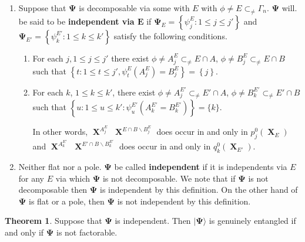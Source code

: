 \documentclass[a4paper,12pt]{article}
\DeclareMathOperator{\x}{\mathrm{X}}
\theoremstyle{definition}
\theoremstyle{underlinethm}
\newtheorem{thm}{Theorem}[section]
\theoremstyle{definition}
\begin{document}
\begin{enumerate}[label = (\roman*)]
 \item Suppose that $\boldsymbol{\Psi}$ is decomposable via some with $E$ with $\phi  \neq E \subset_{\neq} \Gamma_{n}$. $\boldsymbol{\Psi}$ will. be said to be \textbf{independent via $\boldsymbol{E}$} if $ \boldsymbol{\Psi}_{E} = \left\{\psi_{j}^{E} : 1 \leq j \leq j' \right\}$ and $\boldsymbol{\Psi}_{E'} = \left\{\psi_{k}^{E'} : 1 \leq k \leq k' \right\}$  satisfy the following conditions.
\begin{enumerate}[label = (\alph*)]
\item For each $j, 1 \leq j \leq j'$ there exist $\phi \neq A^{E}_{j} \subset_{\neq} E \cap A$, $\phi \neq B_{j}^{E} \subset_{\neq} E \cap B$ such that $\left\{t : 1 \leq t \leq j', \psi_{t}^{E} (A_{j}^{E}) = B_{j}^{E}\right\} = \left\{j\right\}$.

\item For each $k$, $1 \leq k \leq k'$, there exist $\phi \neq A_{j}^{E'} \subset_{\neq} E' \cap A$, $\phi\neq B_{k}^{E'} \subset_{\neq} E' \cap B $ such that $\left\{ u : 1 \leq u \leq k' : \psi_{u}^{E'} (A_{k}^{E'} = B_{k}^{E'})\right\} = \{k\}$.

In other words, $\boldsymbol{\x}^{A_{j}^{E}}$ $\boldsymbol{\x}^{E \cap B \smallsetminus B^{E}_{j}}$ does occur in and only in $p_{j}^{0} (\boldsymbol{\x}_{E})$ and $\boldsymbol{\x}^{A_{k}^{E'}}$ $\boldsymbol{\x}^{E' \cap B \smallsetminus B_{k}^{E'}}$ does occur in and only in $q_{k}^{0}(\boldsymbol{\x}_{E'})$.
\end{enumerate}

\item Neither flat nor a pole. $\boldsymbol{\Psi}$ be called \textbf{independent} if it is independents via $E$ for any $E$ via which $\boldsymbol{\Psi}$  is not decomposable. We note that if $\boldsymbol{\Psi}$ is not decomposable then $\boldsymbol{\Psi}$ is independent by this definition. On the other hand of $\boldsymbol{\Psi}$ is flat or a pole, then $\boldsymbol{\Psi}$ is not independent by this definition.

\end{enumerate}

\begin{thm}\label{thm-3.6}
Suppose that $\boldsymbol{\Psi}$ is independent. Then $| \boldsymbol{\Psi} \rangle$ is genuinely entangled if and only if $\boldsymbol{\Psi}$ is not factorable.
\end{thm}
\end{document}
